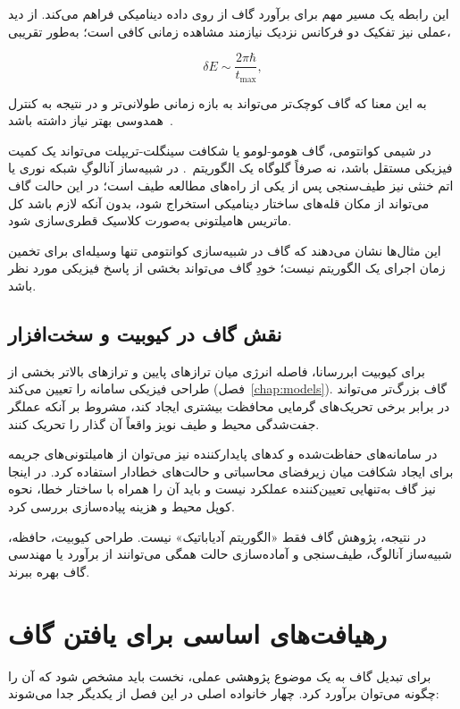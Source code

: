 این رابطه یک مسیر مهم برای برآورد گاف از روی داده دینامیکی فراهم می‌کند.
از دید عملی نیز تفکیک دو فرکانس نزدیک نیازمند مشاهده زمانی کافی است؛ به‌طور تقریبی،

\begin{equation}
	\delta E\sim \frac{2\pi\hbar}{t_{\max}},
\end{equation}

به این معنا که گاف کوچک‌تر می‌تواند به بازه زمانی طولانی‌تر و در نتیجه به کنترل همدوسی بهتر نیاز داشته باشد~\cite{Georgescu2014,Daley2022}.

در شیمی کوانتومی، گاف هومو-لومو یا شکافت سینگلت-تریپلت می‌تواند یک کمیت فیزیکی مستقل باشد، نه صرفاً گلوگاه یک الگوریتم~\cite{McArdle2020,Bauer2020}.
در شبیه‌ساز آنالوگِ شبکه نوری یا اتم خنثی نیز طیف‌سنجی پس از  یکی از راه‌های مطالعه طیف است؛ در این حالت گاف می‌تواند از مکان قله‌های ساختار دینامیکی استخراج شود، بدون آنکه لازم باشد کل ماتریس هامیلتونی به‌صورت کلاسیک قطری‌سازی شود.

این مثال‌ها نشان می‌دهند که گاف در شبیه‌سازی کوانتومی تنها وسیله‌ای برای تخمین زمان اجرای یک الگوریتم نیست؛ خودِ گاف می‌تواند بخشی از پاسخ فیزیکی مورد نظر باشد.

\subsection{نقش گاف در کیوبیت و سخت‌افزار}

برای کیوبیت ابررسانا، فاصله انرژی میان ترازهای پایین و ترازهای بالاتر بخشی از طراحی فیزیکی سامانه را تعیین می‌کند (فصل~\ref{chap:models}).
گاف بزرگ‌تر می‌تواند در برابر برخی تحریک‌های گرمایی محافظت بیشتری ایجاد کند، مشروط بر آنکه عملگر جفت‌شدگی محیط و طیف نویز واقعاً آن گذار را تحریک کنند.

در سامانه‌های حفاظت‌شده و کدهای پایدارکننده نیز می‌توان از هامیلتونی‌های جریمه برای ایجاد شکافت میان زیرفضای محاسباتی و حالت‌های خطادار استفاده کرد.
در اینجا نیز گاف به‌تنهایی تعیین‌کننده عملکرد نیست و باید آن را همراه با ساختار خطا، نحوه کوپل محیط و هزینه پیاده‌سازی بررسی کرد.

در نتیجه، پژوهش گاف فقط «الگوریتم آدیاباتیک» نیست.
طراحی کیوبیت، حافظه، شبیه‌ساز آنالوگ، طیف‌سنجی و آماده‌سازی حالت همگی می‌توانند از برآورد یا مهندسی گاف بهره ببرند.

\section{رهیافت‌های اساسی برای یافتن گاف}

برای تبدیل گاف به یک موضوع پژوهشی عملی، نخست باید مشخص شود که آن را چگونه می‌توان برآورد کرد.
چهار خانواده اصلی در این فصل از یکدیگر جدا می‌شوند:

